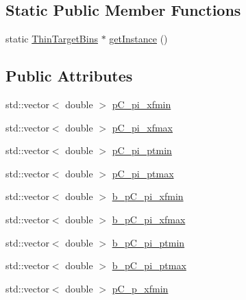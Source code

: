 \subsection*{Static Public Member Functions}
\begin{DoxyCompactItemize}
\item 
static \hyperlink{class_neutrino_flux_reweight_1_1_thin_target_bins}{Thin\-Target\-Bins} $\ast$ \hyperlink{class_neutrino_flux_reweight_1_1_thin_target_bins_aeff5cf7220dd08322f5abac2cbc7ff33}{get\-Instance} ()
\end{DoxyCompactItemize}
\subsection*{Public Attributes}
\begin{DoxyCompactItemize}
\item 
std\-::vector$<$ double $>$ \hyperlink{class_neutrino_flux_reweight_1_1_thin_target_bins_a87af8428f4ca3ce237afedb5bce1e869}{p\-C\-\_\-pi\-\_\-xfmin}
\item 
std\-::vector$<$ double $>$ \hyperlink{class_neutrino_flux_reweight_1_1_thin_target_bins_a052a668add3b703e7be93e09b02e49c7}{p\-C\-\_\-pi\-\_\-xfmax}
\item 
std\-::vector$<$ double $>$ \hyperlink{class_neutrino_flux_reweight_1_1_thin_target_bins_aa64b0a70969bf8e75d8c5bb9b0c902dd}{p\-C\-\_\-pi\-\_\-ptmin}
\item 
std\-::vector$<$ double $>$ \hyperlink{class_neutrino_flux_reweight_1_1_thin_target_bins_a1e80cc8c9297c568dcf389a5ceb11e78}{p\-C\-\_\-pi\-\_\-ptmax}
\item 
std\-::vector$<$ double $>$ \hyperlink{class_neutrino_flux_reweight_1_1_thin_target_bins_a2bab7b871bace2bd4d351c4355d94c4e}{b\-\_\-p\-C\-\_\-pi\-\_\-xfmin}
\item 
std\-::vector$<$ double $>$ \hyperlink{class_neutrino_flux_reweight_1_1_thin_target_bins_a14609f2e58a1c8a7a480e212508dc556}{b\-\_\-p\-C\-\_\-pi\-\_\-xfmax}
\item 
std\-::vector$<$ double $>$ \hyperlink{class_neutrino_flux_reweight_1_1_thin_target_bins_acb1a68d39331ba13d8f166fecc4df7d1}{b\-\_\-p\-C\-\_\-pi\-\_\-ptmin}
\item 
std\-::vector$<$ double $>$ \hyperlink{class_neutrino_flux_reweight_1_1_thin_target_bins_afcd618199b5e49acb93782c67ff9d71e}{b\-\_\-p\-C\-\_\-pi\-\_\-ptmax}
\item 
std\-::vector$<$ double $>$ \hyperlink{class_neutrino_flux_reweight_1_1_thin_target_bins_a7571e704cfcc31b7dc5859aaaa1a6c4b}{p\-C\-\_\-p\-\_\-xfmin}

\end{DoxyCompactItemize}
